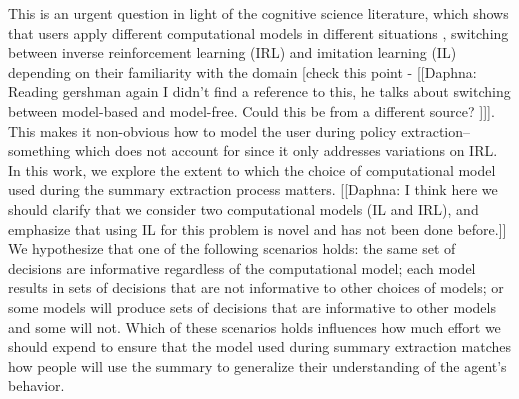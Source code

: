 \documentclass{article}
\newcommand{\comment}[2]{{\color{blue} [[{#1}: {#2}]]}}
\begin{document}
This is an urgent question in light of the cognitive science literature, which shows that users apply different computational models in different situations \cite{gershman2017reinforcement}, switching between inverse reinforcement learning (IRL) and imitation learning (IL) depending on their familiarity with the domain [check this point - \comment{Daphna}{Reading gershman again I didn't find a reference to this, he talks about switching between model-based and model-free. Could this be from a different source? }].  This makes it non-obvious how to model the user during policy extraction--something which \cite{huang17communicate} does not account for since it only addresses variations on IRL.  In this work, we explore the extent to which the choice of computational model used during the summary extraction process matters. \comment{Daphna}{I think here we should clarify that we consider two computational models (IL and IRL), and emphasize that using IL for this problem is novel and has not been done before.}  We hypothesize that one of the following scenarios holds: the same set of decisions are informative regardless of the computational model; each model results in sets of decisions that are not informative to other choices of models; or some models will produce sets of decisions that are informative to other models and some will not.  Which of these scenarios holds influences how much effort we should expend to ensure that the model used during summary extraction matches how people will use the summary to generalize their understanding of the agent's behavior. 

\end{document}
